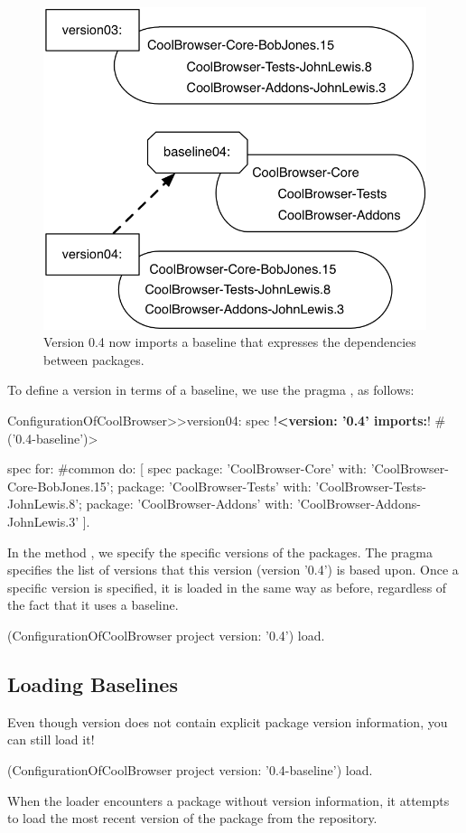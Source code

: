 \documentclass[a4paper,10pt,twoside]{book}
\begin{document}
\begin{figure}
\begin{center}
\includegraphics[width=0.6\linewidth]{version04}
\caption{Version 0.4 now imports a baseline that expresses the dependencies between packages.\label{fig:version04}}
\end{center}
\end{figure} 

To define a version in terms of a baseline, we use the pragma \mbox{}, as follows:

\begin{code}{}
ConfigurationOfCoolBrowser>>version04: spec 
      !\textbf{<version: '0.4' imports:}! #('0.4-baseline')>
       
      spec for: #common do: [
             spec 
                   package: 'CoolBrowser-Core' with: 'CoolBrowser-Core-BobJones.15';
                   package: 'CoolBrowser-Tests' with: 'CoolBrowser-Tests-JohnLewis.8';
                   package: 'CoolBrowser-Addons' with: 'CoolBrowser-Addons-JohnLewis.3' ].
\end{code}

In the method , we specify the specific versions of the packages. The pragma  specifies the list of versions that this version (version '0.4') is based upon. Once a specific version is specified, it is loaded in the same way as before, regardless of the fact that it uses a baseline.

\begin{code}{}
(ConfigurationOfCoolBrowser project version: '0.4') load.
\end{code}

\subsection{Loading Baselines}
Even though version  does not contain explicit package version information, you can still load it!   
\begin{code}{}
(ConfigurationOfCoolBrowser project version: '0.4-baseline') load.
\end{code}
\noindent
When the loader encounters a package without version information, it attempts to load the most recent version of the package from the repository.
\end{document}
